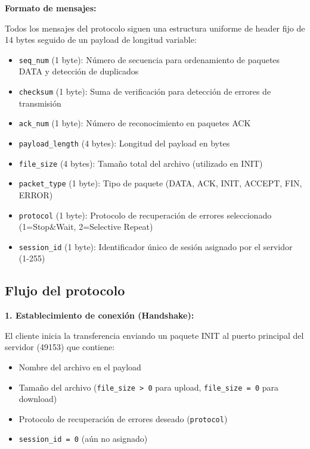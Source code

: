 \begin{enumerate}
    \textbf{Formato de mensajes:}
    
    Todos los mensajes del protocolo siguen una estructura uniforme de header fijo de 14 bytes seguido de un payload de longitud variable:
    
    \begin{itemize}
        \item \texttt{seq\_num} (1 byte): Número de secuencia para ordenamiento de paquetes DATA y detección de duplicados
        \item \texttt{checksum} (1 byte): Suma de verificación para detección de errores de transmisión
        \item \texttt{ack\_num} (1 byte): Número de reconocimiento en paquetes ACK
        \item \texttt{payload\_length} (4 bytes): Longitud del payload en bytes
        \item \texttt{file\_size} (4 bytes): Tamaño total del archivo (utilizado en INIT)
        \item \texttt{packet\_type} (1 byte): Tipo de paquete (DATA, ACK, INIT, ACCEPT, FIN, ERROR)
        \item \texttt{protocol} (1 byte): Protocolo de recuperación de errores seleccionado (1=Stop\&Wait, 2=Selective Repeat)
        \item \texttt{session\_id} (1 byte): Identificador único de sesión asignado por el servidor (1-255)
    \end{itemize}
    
    \subsection*{Flujo del protocolo}
    
    \textbf{1. Establecimiento de conexión (Handshake):}
    
    El cliente inicia la transferencia enviando un paquete INIT al puerto principal del servidor (49153) que contiene:
    \begin{itemize}
        \item Nombre del archivo en el payload
        \item Tamaño del archivo (\texttt{file\_size > 0} para upload, \texttt{file\_size = 0} para download)
        \item Protocolo de recuperación de errores deseado (\texttt{protocol})
        \item \texttt{session\_id = 0} (aún no asignado)
    \end{itemize}
    

\end{enumerate}
